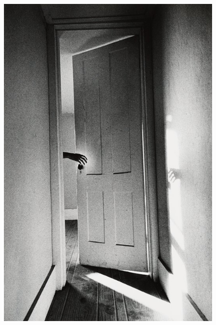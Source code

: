 


\begin{figure}[htpb!]
\thispagestyle{empty}
\vspace*{-2cm}
\hspace*{-2.5cm}
\includegraphics[width=1.5\textwidth]{./IMAGEM.jpg}
\end{figure}

